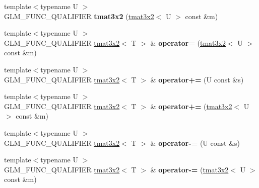 \begin{DoxyCompactItemize}
\item 
\hypertarget{structglm_1_1detail_1_1tmat3x2_a803c1e14c376bd263ec8ccae8378f137}{}{\footnotesize template$<$typename U $>$ }\\G\+L\+M\+\_\+\+F\+U\+N\+C\+\_\+\+Q\+U\+A\+L\+I\+F\+I\+E\+R {\bfseries tmat3x2} (\hyperlink{structglm_1_1detail_1_1tmat3x2}{tmat3x2}$<$ U $>$ const \&m)\label{structglm_1_1detail_1_1tmat3x2_a803c1e14c376bd263ec8ccae8378f137}

\item 
\hypertarget{structglm_1_1detail_1_1tmat3x2_a3ffe522fe74a4e47b0ba85e6bd601a3b}{}{\footnotesize template$<$typename U $>$ }\\G\+L\+M\+\_\+\+F\+U\+N\+C\+\_\+\+Q\+U\+A\+L\+I\+F\+I\+E\+R \hyperlink{structglm_1_1detail_1_1tmat3x2}{tmat3x2}$<$ T $>$ \& {\bfseries operator=} (\hyperlink{structglm_1_1detail_1_1tmat3x2}{tmat3x2}$<$ U $>$ const \&m)\label{structglm_1_1detail_1_1tmat3x2_a3ffe522fe74a4e47b0ba85e6bd601a3b}

\item 
\hypertarget{structglm_1_1detail_1_1tmat3x2_a68617fea729222134358dcd0de6115f4}{}{\footnotesize template$<$typename U $>$ }\\G\+L\+M\+\_\+\+F\+U\+N\+C\+\_\+\+Q\+U\+A\+L\+I\+F\+I\+E\+R \hyperlink{structglm_1_1detail_1_1tmat3x2}{tmat3x2}$<$ T $>$ \& {\bfseries operator+=} (U const \&s)\label{structglm_1_1detail_1_1tmat3x2_a68617fea729222134358dcd0de6115f4}

\item 
\hypertarget{structglm_1_1detail_1_1tmat3x2_a2bfa942aef7f6039f190d4c0dbbc4df4}{}{\footnotesize template$<$typename U $>$ }\\G\+L\+M\+\_\+\+F\+U\+N\+C\+\_\+\+Q\+U\+A\+L\+I\+F\+I\+E\+R \hyperlink{structglm_1_1detail_1_1tmat3x2}{tmat3x2}$<$ T $>$ \& {\bfseries operator+=} (\hyperlink{structglm_1_1detail_1_1tmat3x2}{tmat3x2}$<$ U $>$ const \&m)\label{structglm_1_1detail_1_1tmat3x2_a2bfa942aef7f6039f190d4c0dbbc4df4}

\item 
\hypertarget{structglm_1_1detail_1_1tmat3x2_a1705976d62e31249e26d0d9baf996147}{}{\footnotesize template$<$typename U $>$ }\\G\+L\+M\+\_\+\+F\+U\+N\+C\+\_\+\+Q\+U\+A\+L\+I\+F\+I\+E\+R \hyperlink{structglm_1_1detail_1_1tmat3x2}{tmat3x2}$<$ T $>$ \& {\bfseries operator-\/=} (U const \&s)\label{structglm_1_1detail_1_1tmat3x2_a1705976d62e31249e26d0d9baf996147}

\item 
\hypertarget{structglm_1_1detail_1_1tmat3x2_ae922cabe9775685a5f7d2af6f904b7e4}{}{\footnotesize template$<$typename U $>$ }\\G\+L\+M\+\_\+\+F\+U\+N\+C\+\_\+\+Q\+U\+A\+L\+I\+F\+I\+E\+R \hyperlink{structglm_1_1detail_1_1tmat3x2}{tmat3x2}$<$ T $>$ \& {\bfseries operator-\/=} (\hyperlink{structglm_1_1detail_1_1tmat3x2}{tmat3x2}$<$ U $>$ const \&m)\label{structglm_1_1detail_1_1tmat3x2_ae922cabe9775685a5f7d2af6f904b7e4}


\end{DoxyCompactItemize}
